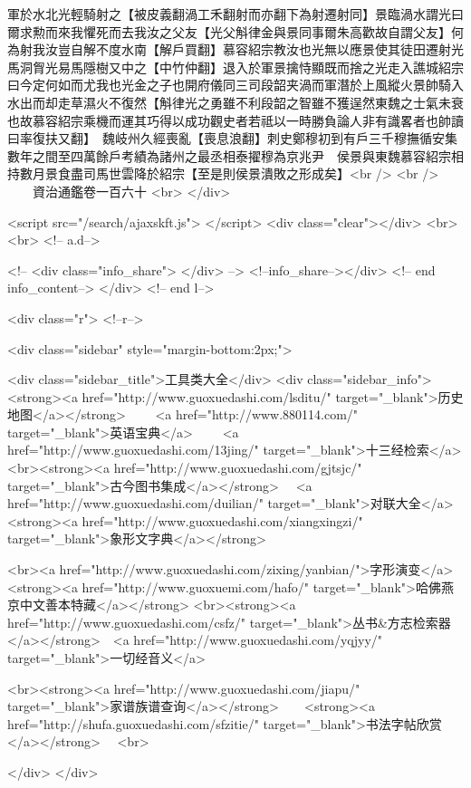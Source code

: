 軍於水北光輕騎射之【被皮義翻渦工禾翻射而亦翻下為射遷射同】景臨渦水謂光曰爾求勲而來我懼死而去我汝之父友【光父斛律金與景同事爾朱高歡故自謂父友】何為射我汝豈自解不度水南【解戶買翻】慕容紹宗教汝也光無以應景使其徒田遷射光馬洞胷光易馬隱樹又中之【中竹仲翻】退入於軍景擒恃顯既而捨之光走入譙城紹宗曰今定何如而尤我也光金之子也開府儀同三司段韶夹渦而軍潛於上風縱火景帥騎入水出而却走草濕火不復然【斛律光之勇雖不利段韶之智雖不獲逞然東魏之士氣未衰也故慕容紹宗乘機而運其巧得以成功觀史者若祗以一時勝負論人非有識畧者也帥讀曰率復扶又翻】　魏岐州久經喪亂【喪息浪翻】刺史鄭穆初到有戶三千穆撫循安集數年之間至四萬餘戶考績為諸州之最丞相泰擢穆為京兆尹　侯景與東魏慕容紹宗相持數月景食盡司馬世雲降於紹宗【至是則侯景潰敗之形成矣】<br />
<br />
　　資治通鑑卷一百六十  <br>
   </div> 

<script src="/search/ajaxskft.js"> </script>
 <div class="clear"></div>
<br>
<br>
 <!-- a.d-->

 <!--
<div class="info_share">
</div> 
-->
 <!--info_share--></div>   <!-- end info_content-->
  </div> <!-- end l-->

<div class="r">   <!--r-->



<div class="sidebar"  style="margin-bottom:2px;">

 
<div class="sidebar_title">工具类大全</div>
<div class="sidebar_info">
<strong><a href="http://www.guoxuedashi.com/lsditu/" target="_blank">历史地图</a></strong>　　
<a href="http://www.880114.com/" target="_blank">英语宝典</a>　　
<a href="http://www.guoxuedashi.com/13jing/" target="_blank">十三经检索</a>　
<br><strong><a href="http://www.guoxuedashi.com/gjtsjc/" target="_blank">古今图书集成</a></strong>　
<a href="http://www.guoxuedashi.com/duilian/" target="_blank">对联大全</a>　<strong><a href="http://www.guoxuedashi.com/xiangxingzi/" target="_blank">象形文字典</a></strong>　

<br><a href="http://www.guoxuedashi.com/zixing/yanbian/">字形演变</a>　　<strong><a href="http://www.guoxuemi.com/hafo/" target="_blank">哈佛燕京中文善本特藏</a></strong>
<br><strong><a href="http://www.guoxuedashi.com/csfz/" target="_blank">丛书&方志检索器</a></strong>　<a href="http://www.guoxuedashi.com/yqjyy/" target="_blank">一切经音义</a>　　

<br><strong><a href="http://www.guoxuedashi.com/jiapu/" target="_blank">家谱族谱查询</a></strong>　　<strong><a href="http://shufa.guoxuedashi.com/sfzitie/" target="_blank">书法字帖欣赏</a></strong>　
<br>

</div>
</div>



